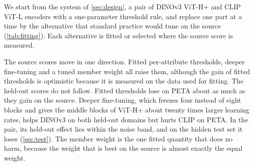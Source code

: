 \documentclass[10pt,twocolumn,letterpaper]{article}
\begin{document}
We start from the system of \cref{sec:design}, a pair of DINOv3 ViT-H+ and CLIP ViT-L encoders with a one-parameter threshold rule, and replace one part at a time by the alternative that standard practice would tune on the source (\cref{tab:fitting}). Each alternative is fitted or selected where the source score is measured.

The source scores move in one direction. Fitted per-attribute thresholds, deeper fine-tuning and a tuned member weight all raise them, although the gain of fitted thresholds is optimistic because it is measured on the data used for fitting. The held-out scores do not follow. Fitted thresholds lose on PETA about as much as they gain on the source. Deeper fine-tuning, which freezes four instead of eight blocks and gives the middle blocks of ViT-H+ about twenty times larger learning rates, helps DINOv3 on both held-out domains but hurts CLIP on PETA. In the pair, its held-out effect lies within the noise band, and on the hidden test set it loses (\cref{sec:test}). The member weight is the one fitted quantity that does no harm, because the weight that is best on the source is almost exactly the equal weight.

\begin{table}[t]
\centering\small
\setlength{\tabcolsep}{3pt}
\caption{Change in Avg when a part of the system is replaced by an alternative tuned on the source domains.}
\label{tab:fitting}
\end{table}
\end{document}
